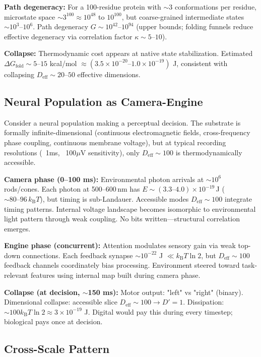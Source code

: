 \documentclass[12pt]{article}
\numberwithin{equation}{section}
\newcommand{\kB}{k_{\mathrm{B}}}
\begin{document}
\textbf{Path degeneracy:} For a 100-residue protein with $\sim 3$ conformations per residue, microstate space $\sim 3^{100} \approx 10^{48}$ to $10^{100}$, but coarse-grained intermediate states $\sim 10^{3}$--$10^{6}$. Path degeneracy $G \sim 10^{42}$--$10^{94}$ (upper bounds; folding funnels reduce effective degeneracy via correlation factor $\kappa \sim 5$--$10$).

\textbf{Collapse:} Thermodynamic cost appears at native state stabilization. Estimated $\Delta G_{\text{fold}} \sim 5$--$15$ kcal/mol $\approx (3.5\times10^{-20}\text{--}1.0\times10^{-19})$ J, consistent with collapsing $D_{\text{eff}} \sim 20$--$50$ effective dimensions.

\subsection{Neural Population as Camera-Engine}

Consider a neural population making a perceptual decision. The substrate is formally infinite-dimensional (continuous electromagnetic fields, cross-frequency phase coupling, continuous membrane voltage), but at typical recording resolutions (~1ms, ~100$\mu$V sensitivity), only $D_{\text{eff}} \sim 100$ is thermodynamically accessible.

\textbf{Camera phase (0--100 ms):} Environmental photon arrivals at $\sim 10^{6}$ rods/cones. Each photon at 500--600\,nm has $E\sim(3.3\text{--}4.0)\times10^{-19}\,$J ($\sim 80\text{--}96\,\kB T$), but timing is sub-Landauer. Accessible modes $D_{\text{eff}} \sim 100$ integrate timing patterns. Internal voltage landscape becomes isomorphic to environmental light pattern through weak coupling. No bits written—structural correlation emerges.

\textbf{Engine phase (concurrent):} Attention modulates sensory gain via weak top-down connections. Each feedback synapse $\sim 10^{-22}$ J $\ll \kB T\ln 2$, but $D_{\text{eff}} \sim 100$ feedback channels coordinately bias processing. Environment steered toward task-relevant features using internal map built during camera phase.

\textbf{Collapse (at decision, $\sim$150 ms):} Motor output: "left" vs "right" (binary). Dimensional collapse: accessible slice $D_{\text{eff}} \sim 100 \to D' = 1$. Dissipation: $\sim 100 \kB T\ln 2 \approx 3 \times 10^{-19}$ J. Digital would pay this during every timestep; biological pays once at decision.

\subsection{Cross-Scale Pattern}
\end{document}
